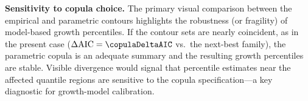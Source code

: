 \documentclass[10pt]{article}
\begin{document}
\begin{minipage}[t]{7.8in}
\begin{minipage}{7.4in}
    \vspace{6pt}
    \textbf{Sensitivity to copula choice.}\enspace
    The primary visual comparison between the empirical and parametric contours
    highlights the robustness (or fragility) of model-based growth percentiles.
    If the contour sets are nearly coincident, as in the present case
    ($\Delta\mathrm{AIC} = \copulaDeltaAIC$ vs.\ the next-best family), the
    parametric copula is an adequate summary and the resulting growth percentiles
    are stable. Visible divergence would signal that percentile estimates near the
    affected quantile regions are sensitive to the copula specification---a key
    diagnostic for growth-model calibration.

  \end{minipage}
  \vspace{0.1in}
\end{minipage}
\end{document}

